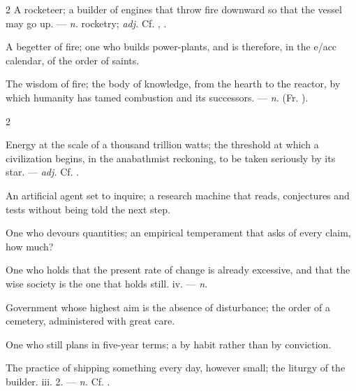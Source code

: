 \begin{multicols}{2}
 A rocketeer; a builder of engines that throw fire downward so that the vessel may go up. —  \textit{n.} rocketry;  \textit{adj.} Cf. , .

 A begetter of fire; one who builds power-plants, and is therefore, in the e/acc calendar, of the order of saints.

 The wisdom of fire; the body of knowledge, from the hearth to the reactor, by which humanity has tamed combustion and its successors. —  \textit{n.} (Fr. ).

\end{multicols}

\begin{multicols}{2}

 Energy at the scale of a thousand trillion watts; the threshold at which a civilization begins, in the anabathmist reckoning, to be taken seriously by its star. —  \textit{adj.} Cf. .

 An artificial agent set to inquire; a research machine that reads, conjectures and tests without being told the next step.  

 One who devours quantities; an empirical temperament that asks of every claim, how much?

 One who holds that the present rate of change is already excessive, and that the wise society is the one that holds still.   iv. —  \textit{n.}

 Government whose highest aim is the absence of disturbance; the order of a cemetery, administered with great care.

 One who still plans in five-year terms; a  by habit rather than by conviction.

 The practice of shipping something every day, however small; the liturgy of the builder.   iii. 2. —  \textit{n.} Cf. .

\end{multicols}

